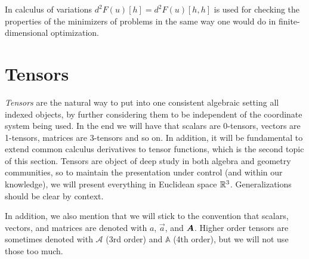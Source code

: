 
In calculus of variations $d^2 F(u)[h] = d^2 F(u)[h,h]$ is used for checking the properties of the minimizers of problems in the same way one would do in finite-dimensional optimization.

\section{Tensors}\label{sec:tensors}
\emph{Tensors} are the natural way to put into one consistent algebraic setting all indexed objects, by further considering them to be independent of the coordinate system being used. In the end we will have that scalars are 0-tensors, vectors are 1-tensors, matrices are 3-tensors and so on. In addition, it will be fundamental to extend common calculus derivatives to tensor functions, which is the second topic of this section. Tensors are object of deep study in both algebra and geometry communities, so to maintain the presentation under control (and within our knowledge), we will present everything in Euclidean space $\mathbb{R}^3$. Generalizations should be clear by context. 

In addition, we also mention that we will stick to the convention that scalars, vectors, and matrices are denoted with $a$, $\vec a$, and $\mat A$. Higher order tensors are sometimes denoted with $\mathcal A$ (3rd order) and $\mathbb A$ (4th order), but we will not use those too much. 

